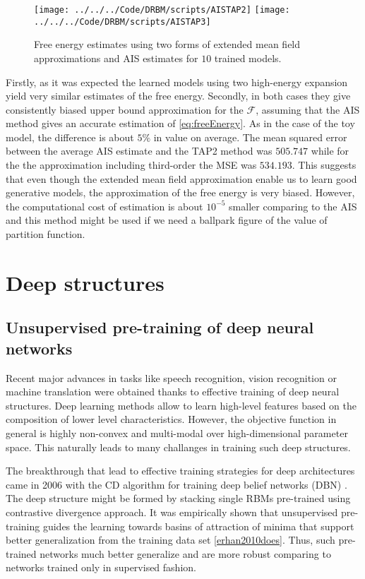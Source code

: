 \begin{figure}[!htb]
%
 \texttt{[image: ../../../Code/DRBM/scripts/AISTAP2]}
\endminipage 
{}  
 \texttt{[image: ../../../Code/DRBM/scripts/AISTAP3]}
\endminipage\hfill
  \caption[Comparison of AIS and EMF on RBM with $500$ hidden units]{Free energy estimates using two forms of extended mean field approximations and AIS estimates for $10$ trained models.}
  \label{fig:AISTAP2}
\end{figure}

Firstly, as it was expected the learned models using two high-energy expansion yield very similar estimates of the free energy. Secondly, in both cases they give consistently biased upper bound approximation for the $\mathcal{F}$, assuming that the AIS method gives an accurate estimation of \ref{eq:freeEnergy}. As in the case of the toy model, the difference is about $5 \%$ in value on average. The mean squared error between the average AIS estimate and the TAP2 method was $505.747$ while for the the approximation including third-order the MSE was $534.193$. This suggests that even though the extended mean field approximation enable us to learn good generative models, the approximation of the free energy is very biased. However, the computational cost of estimation is about $10^{-5}$ smaller comparing to the AIS and this method might be used if we need a ballpark figure of the value of partition function.

\section{Deep structures}
\subsection{Unsupervised pre-training of deep neural networks}
Recent major advances in tasks like speech recognition, vision recognition or machine translation were obtained thanks to effective training of deep neural structures. Deep learning methods allow to learn high-level features based on the composition of lower level characteristics. However, the objective function in general is highly non-convex and multi-modal over high-dimensional parameter space. This naturally leads to many challanges in training such deep structures.
 
The breakthrough that lead to effective training strategies for deep architectures came in 2006 with the CD algorithm for training deep belief networks (DBN) \cite{hinton2006reducing}. The deep structure might be formed by stacking single RBMs pre-trained using contrastive divergence approach. It was empirically shown that unsupervised pre-training guides the learning towards basins of attraction of minima that support better generalization from the training data set \ref{erhan2010does}. Thus, such pre-trained networks much better generalize and are more robust comparing to networks trained only in supervised fashion.

